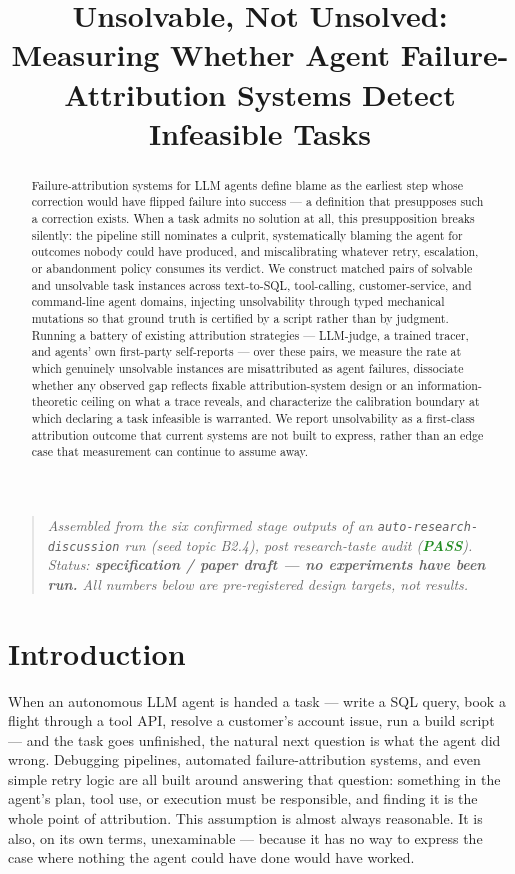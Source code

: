 \documentclass[11pt]{article}
\title{\textbf{Unsolvable, Not Unsolved:\\ Measuring Whether Agent Failure-Attribution Systems Detect Infeasible Tasks}}
\author{}
\date{}
\begin{document}
\maketitle
\vspace{-2em}

\begin{quote}
\small\textit{Assembled from the six confirmed stage outputs of an \texttt{auto-research-discussion} run (seed topic B2.4), post research-taste audit (\textcolor{ForestGreen}{\textbf{PASS}}). Status: \textbf{specification / paper draft --- no experiments have been run.} All numbers below are pre-registered design targets, not results.}
\end{quote}

\begin{abstract}
Failure-attribution systems for LLM agents define blame as the earliest step whose correction would have flipped failure into success --- a definition that presupposes such a correction exists. When a task admits no solution at all, this presupposition breaks silently: the pipeline still nominates a culprit, systematically blaming the agent for outcomes nobody could have produced, and miscalibrating whatever retry, escalation, or abandonment policy consumes its verdict. We construct matched pairs of solvable and unsolvable task instances across text-to-SQL, tool-calling, customer-service, and command-line agent domains, injecting unsolvability through typed mechanical mutations so that ground truth is certified by a script rather than by judgment. Running a battery of existing attribution strategies --- LLM-judge, a trained tracer, and agents' own first-party self-reports --- over these pairs, we measure the rate at which genuinely unsolvable instances are misattributed as agent failures, dissociate whether any observed gap reflects fixable attribution-system design or an information-theoretic ceiling on what a trace reveals, and characterize the calibration boundary at which declaring a task infeasible is warranted. We report unsolvability as a first-class attribution outcome that current systems are not built to express, rather than an edge case that measurement can continue to assume away.
\end{abstract}

\section{Introduction}

When an autonomous LLM agent is handed a task --- write a SQL query, book a flight through a tool API, resolve a customer's account issue, run a build script --- and the task goes unfinished, the natural next question is what the agent did wrong. Debugging pipelines, automated failure-attribution systems, and even simple retry logic are all built around answering that question: something in the agent's plan, tool use, or execution must be responsible, and finding it is the whole point of attribution. This assumption is almost always reasonable. It is also, on its own terms, unexaminable --- because it has no way to express the case where nothing the agent could have done would have worked.
\end{document}
